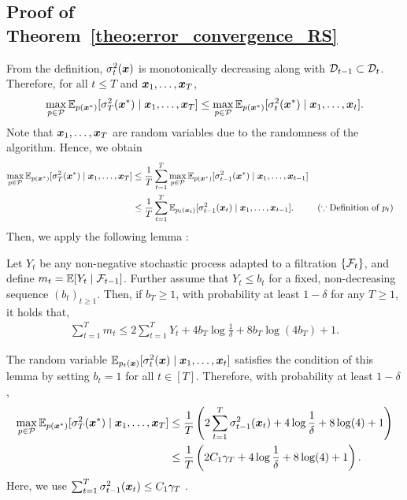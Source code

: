 \subsection{Proof of Theorem~\ref{theo:error_convergence_RS}}

From the definition, $\sigma_t^2(\boldsymbol{x})$ is monotonically decreasing along with ${\cal D}_{t-1} \subset {\cal D}_t$.
%
Therefore, for all $t \leq T$ and $\boldsymbol{x}_1, \dots, \boldsymbol{x}_T$, 
\begin{align*}
    \max_{p \in {\cal P}} \mathbb{E}_{p(\boldsymbol{x}^*)}[\sigma_{T}^2(\boldsymbol{x}^*) \mid \boldsymbol{x}_1, \dots, \boldsymbol{x}_T]
    \leq 
    \max_{p \in {\cal P}} \mathbb{E}_{p(\boldsymbol{x}^*)}[\sigma_{t}^2(\boldsymbol{x}^*) \mid \boldsymbol{x}_1, \dots, \boldsymbol{x}_t].
\end{align*}
%
Note that $\boldsymbol{x}_1, \dots, \boldsymbol{x}_T$ are random variables due to the randomness of the algorithm.
%
Hence, we obtain
\begin{align*}
    \max_{p \in {\cal P}} \mathbb{E}_{p(\boldsymbol{x}^*)}[\sigma_{T}^2(\boldsymbol{x}^*) \mid \boldsymbol{x}_1, \dots, \boldsymbol{x}_T]
    &\leq 
    \frac{1}{T} \sum_{t=1}^T
    \max_{p \in {\cal P}} \mathbb{E}_{p(\boldsymbol{x}^*)}[\sigma_{t-1}^2(\boldsymbol{x}^*) \mid \boldsymbol{x}_1, \dots, \boldsymbol{x}_{t-1}] \\
    &\leq
    \frac{1}{T} \sum_{t=1}^T
    \mathbb{E}_{p_t(\boldsymbol{x}_t)}[\sigma_{t-1}^2(\boldsymbol{x}_t) \mid \boldsymbol{x}_1, \dots, \boldsymbol{x}_{t-1}]. && (\because \text{Definition of $p_t$})
\end{align*}
%
Then, we apply the following lemma \citep[Lemma 3 in][]{kirschner2018-information}:
\begin{lemma}
    Let $Y_t$ be any non-negative stochastic process adapted to a filtration $\{ {\cal F}_t \}$, and define $m_t = \mathbb{E}[Y_t \mid {\cal F}_{t-1}]$.
    Further assume that $Y_t \leq b_t$ for a fixed, non-decreasing sequence $(b_t)_{t \geq 1}$.
    Then, if $b_T \geq 1$, with probability at least $1 - \delta$ for any $T \geq 1$, it holds that,
    \begin{align*}
        \sum_{t=1}^T m_t \leq 2 \sum_{t=1}^T Y_t + 4 b_T \log \frac{1}{\delta} + 8b_T \log(4 b_T) + 1.
    \end{align*}
\end{lemma}
%
The random variable $\mathbb{E}_{p_t(\boldsymbol{x})}[\sigma_{t}^2(\boldsymbol{x}) \mid \boldsymbol{x}_1, \dots, \boldsymbol{x}_t]$ satisfies the condition of this lemma by setting $b_t = 1$ for all $t \in [T]$.
%
Therefore, with probability at least $1 - \delta$,
\begin{align*}
    \max_{p \in {\cal P}} \mathbb{E}_{p(\boldsymbol{x}^*)}[\sigma_{T}^2(\boldsymbol{x}^*) \mid \boldsymbol{x}_1, \dots, \boldsymbol{x}_T]
    &\leq 
    \frac{1}{T} \left( 
    2 \sum_{t=1}^T \sigma_{t-1}^2(\boldsymbol{x}_t) + 4\log\frac{1}{\delta} + 8 \log(4) + 1
    \right) \\
    &\leq 
    \frac{1}{T} \left( 
    2 C_1 \gamma_T + 4\log\frac{1}{\delta} + 8 \log(4) + 1
    \right).
\end{align*}
%
Here, we use $\sum_{t=1}^T \sigma_{t-1}^2(\boldsymbol{x}_t) \leq C_1 \gamma_T$ \citep[Lemma~5.2 in][]{Srinivas2010-Gaussian}.



